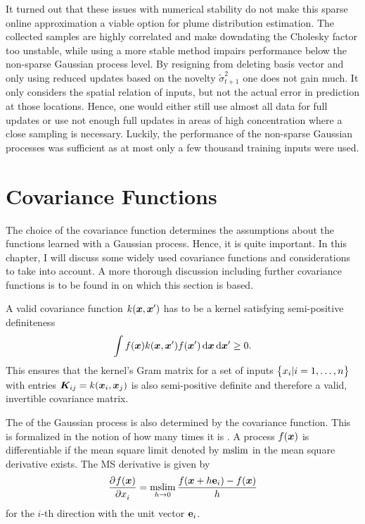 It turned out that these issues with numerical stability do not make this sparse 
online approximation a viable option for plume distribution estimation. The 
collected samples are highly correlated and make downdating the Cholesky factor 
too unstable, while using a more stable method impairs performance below the 
non-sparse Gaussian process level. By resigning from deleting basis vector and 
only using reduced updates based on the novelty $\tilde{\sigma}^2_{t+1}$ one 
does not gain much. It only considers the spatial relation of inputs, but not 
the actual error in prediction at those locations. Hence, one would either still 
use almost all data for full updates or use not enough full updates in areas of 
high concentration where a close sampling is necessary. Luckily, the performance 
of the non-sparse Gaussian processes was sufficient as at most only a few 
thousand training inputs were used.

\section{Covariance Functions}\label{sec:covfn}
The choice of the covariance function determines the assumptions about the 
functions learned with a Gaussian process. Hence, it is quite important. In this 
chapter, I will discuss some widely used covariance functions and considerations 
to take into account. A more thorough discussion including further covariance 
functions is to be found in \textcite[Chapter 4]{Rasmussen:2006vz} on which this 
section is based.

A valid covariance function $k(\bm{x}, \bm{x}')$ has to be a kernel 
\parencite{Cressie:1993uu} satisfying semi-positive definiteness
\begin{equation}
    \int f(\vc x) k(\vc x, \vc x') f(\vc x') \dif \vc x \dif \vc x' \geq 
    0 \text{.}
\end{equation}
This ensures that the kernel's Gram matrix for a set of inputs $\cbr{x_i 
    | i = 1, \dots, n}$ with entries $\bm{K}_{ij} = k(\bm{x}_i, \bm{x}_j)$ is also 
semi-positive definite and therefore a valid, invertible covariance matrix.

The  of the Gaussian process is also determined by the 
covariance function.  This is formalized in the notion of how many times it is 
.  A process $f(\bm{x})$ 
is differentiable if the mean square limit denoted by $\operatorname*{mslim}$ in the mean 
square derivative exists. The MS derivative is given by
\begin{equation}
    \dpd{f(\vc x)}{x_i} = \mslim_{h \rightarrow 0} \frac{f(\vc x + h\vcc e_i) 
    - f(\vc x)}{h}
\end{equation}
for the $i$-th direction with the unit vector $\textbf{e}_i$.

